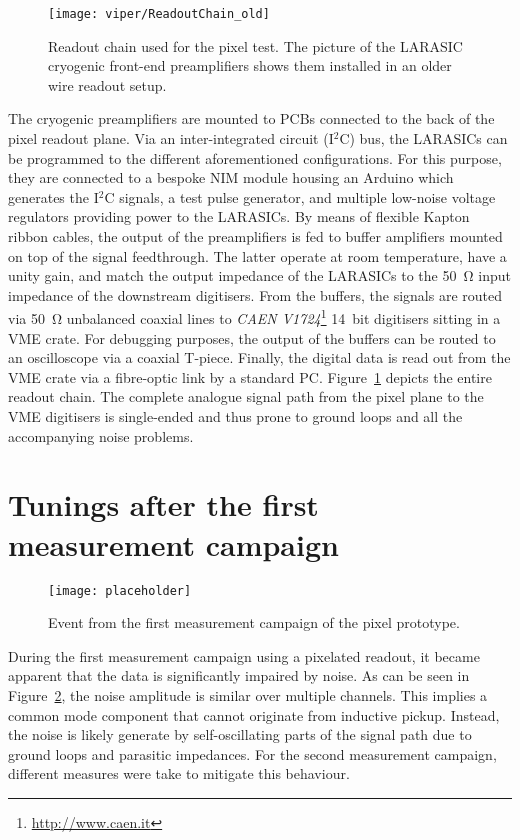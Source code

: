 \begin{figure}[htb] %
	\centering
	\texttt{[image: viper/ReadoutChain\_old]}
	\caption{Readout chain used for the pixel test. The picture of the LARASIC cryogenic front-end preamplifiers shows them installed in an older wire readout setup.~\cite{AT_larasic}}
	\label{fig:viper_readoutChain_old}
\end{figure}

The cryogenic preamplifiers are mounted to PCBs connected to the back of the pixel readout plane.
Via an inter-integrated circuit (I$^2$C) bus, the LARASICs can be programmed to the different aforementioned configurations.
For this purpose, they are connected to a bespoke NIM module housing an Arduino which generates the I$^2$C signals, a test pulse generator, and multiple low-noise voltage regulators providing power to the LARASICs.
By means of flexible Kapton ribbon cables, the output of the preamplifiers is fed to buffer amplifiers mounted on top of the signal feedthrough.
The latter operate at room temperature, have a unity gain, and match the output impedance of the LARASICs to the \SI{50}{\ohm} input impedance of the downstream digitisers.
From the buffers, the signals are routed via \SI{50}{\ohm} unbalanced coaxial lines to \emph{CAEN V1724}\footnote{\href{http://www.caen.it}{http://www.caen.it}} \SI{14}{bit} digitisers sitting in a VME crate.
For debugging purposes, the output of the buffers can be routed to an oscilloscope via a coaxial T-piece.
Finally, the digital data is read out from the VME crate via a fibre-optic link by a standard PC.
Figure~\ref{fig:viper_readoutChain_old} depicts the entire readout chain.
The complete analogue signal path from the pixel plane to the VME digitisers is single-ended and thus prone to ground loops and all the accompanying noise problems.


\section{Tunings after the first measurement campaign\label{sec:rd-dune-nd_tuning}}

\begin{figure}[htb] %
	\centering
	\texttt{[image: placeholder]}
	\caption{Event from the first measurement campaign of the pixel prototype.}
	\label{fig:viper_noisy-event}
\end{figure}

During the first measurement campaign using a pixelated readout, it became apparent that the data is significantly impaired by noise.
As can be seen in Figure~\ref{fig:viper_noisy-event}, the noise amplitude is similar over multiple channels.
This implies a common mode component that cannot originate from inductive pickup.
Instead, the noise is likely generate by self-oscillating parts of the signal path due to ground loops and parasitic impedances.
For the second measurement campaign, different measures were take to mitigate this behaviour.

